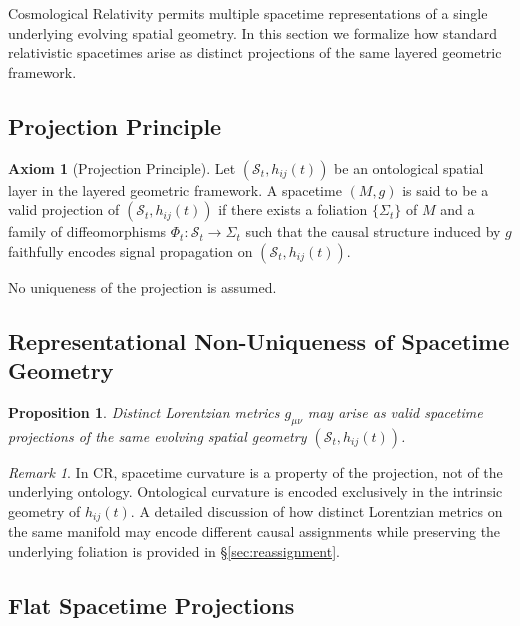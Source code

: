 \documentclass[11pt,a4paper]{article}
\theoremstyle{plain}
\newtheorem{proposition}{Proposition}
\theoremstyle{definition}
\newtheorem{axiom}{Axiom}
\theoremstyle{remark}
\newtheorem{remark}{Remark}
\begin{document}
Cosmological Relativity permits multiple spacetime representations of a single underlying evolving spatial geometry. In this section we formalize how standard relativistic spacetimes arise as distinct projections of the same layered geometric framework.

\subsection{Projection Principle}\label{sec:CR-projection}

\begin{axiom}[Projection Principle]
Let $(\mathcal{S}_t,h_{ij}(t))$ be an ontological spatial layer in the layered geometric framework. A spacetime $(M,g)$ is said to be a valid projection of $(\mathcal{S}_t,h_{ij}(t))$ if there exists a foliation $\{\Sigma_t\}$ of $M$ and a family of diffeomorphisms $\Phi_t:\mathcal{S}_t\rightarrow\Sigma_t$ such that the causal structure induced by $g$ faithfully encodes signal propagation on $(\mathcal{S}_t,h_{ij}(t))$.
\end{axiom}

No uniqueness of the projection is assumed.

\subsection{Representational Non-Uniqueness of Spacetime Geometry}

\begin{proposition}
Distinct Lorentzian metrics $g_{\mu\nu}$ may arise as valid spacetime projections of the same evolving spatial geometry $(\mathcal{S}_t,h_{ij}(t))$.
\end{proposition}

\begin{remark}
In CR, spacetime curvature is a property of the projection, not of the underlying ontology. Ontological curvature is encoded exclusively in the intrinsic geometry of $h_{ij}(t)$. A detailed discussion of how distinct Lorentzian metrics on the same manifold may encode different causal assignments while preserving the underlying foliation is provided in \S\ref{sec:reassignment}.
\end{remark}

\subsection{Flat Spacetime Projections}\label{sec:CR-minkowski}
\end{document}
